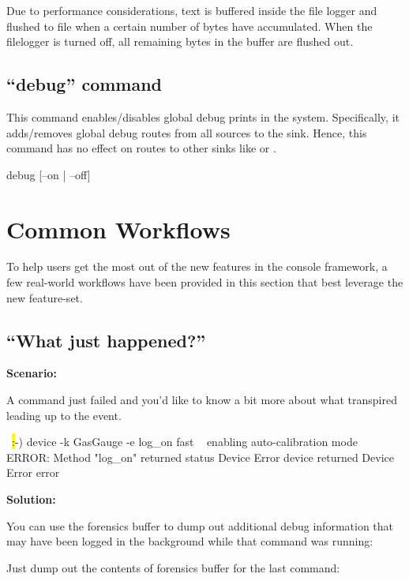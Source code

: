 Due to performance considerations, text is buffered inside the file logger and flushed to file when a certain number of bytes have accumulated. When the filelogger is turned off, all remaining bytes in the buffer are flushed out. 

\subsection{``debug'' command}

This command enables/disables global debug prints in the system. Specifically, it adds/removes global debug routes from all sources to the  sink. Hence, this command 
has no effect on routes to other sinks like  or . 

\begin{CommandLine}
debug [--on | --off]
\end{CommandLine}

\section{Common Workflows}

To help users get the most out of the new features in the console framework, a few real-world workflows have been provided in this section that best leverage the new feature-set.

\subsection{``What just happened?''}

\bfseries Scenario:

\mdseries A command just failed and you'd like to know a bit more about what transpired leading up to the event.

\begin{LuaCode}
~\hl:-) device -k GasGauge -e log\_on fast ~
enabling auto-calibration mode
ERROR: Method "log_on" returned status Device Error
device returned Device Error error
\end{LuaCode}

\bfseries Solution:

\mdseries You can use the forensics buffer to dump out additional debug information that may have been logged in the background while that command was running:

Just dump out the contents of forensics buffer for the last command:

